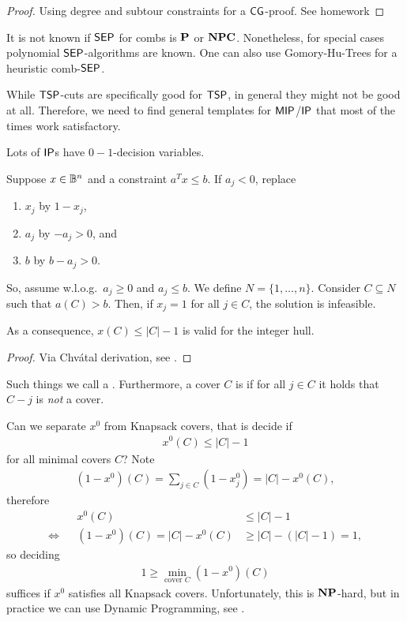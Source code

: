 \begin{proof}
    Using degree and subtour constraints for a $\mathsf{CG}$-proof. See homework 
\end{proof}
\begin{remark}
    It is not known if $\mathsf{SEP}$ for combs is $\mathbf{P}$ or $\mathbf{NPC}$.
    Nonetheless, for special cases polynomial $\mathsf{SEP}$-algorithms are known.
    One can also use Gomory-Hu-Trees for a heuristic comb-$\mathsf{SEP}$.
\end{remark}
While $\mathsf{TSP}$-cuts are specifically good for $\mathsf{TSP}$, in general they might not be good at all.
Therefore, we need to find general templates for $\mathsf{MIP}$/$\mathsf{IP}$ that most of the times work satisfactory.

Lots of $\mathsf{IP}$s have $0-1$-decision variables.

Suppose $x \in \mathbb{B}^n$ and a constraint $a^Tx \leq b$.
If $a_j < 0$, replace
\begin{enumerate}
    \item $x_j$ by $1-x_j$,
    \item $a_j$ by $-a_j > 0$, and
    \item $b$ by $b-a_j > 0$.
\end{enumerate}
So, assume w.l.o.g.\ $a_j \geq 0$ and $a_j \leq b$. We define $N = \{1,\dots, n\}$.
Consider $C \subseteq N$ such that $a(C)>b$.
Then, if $x_j=1$ for all $j \in C$, the solution is infeasible.
\begin{theorem}
    As a consequence, $x(C) \leq |C|-1$ is valid for the integer hull.
\end{theorem}
\begin{proof}
    Via Chv\'atal derivation, see .
\end{proof}
\begin{definition}
    Such things we call a .
    Furthermore,  a cover $C$ is  if for all $j \in C$ it holds that $C-j$ is \emph{not} a cover.
\end{definition}
Can we separate $x^0$ from Knapsack covers, that is decide if
\begin{align*}
    x^0(C) \leq |C|-1
\end{align*}
for all minimal covers $C$?
Note
\begin{align*}
    (1-x^0)(C) = \sum_{j \in C}(1-x^0_j)= |C|-x^0(C),
\end{align*}
therefore
\begin{align*}
                    &  & x^0(C)                  & \leq |C|-1            \\
    \Leftrightarrow &  & (1-x^0)(C) = |C|-x^0(C) & \geq |C| - (|C|-1)=1,
\end{align*}
so deciding
\begin{align*}
    1 \geq \min_{\text{cover }C}(1-x^0)(C)
\end{align*}
suffices if $x^0$ satisfies all Knapsack covers.
Unfortunately, this is $\mathbf{NP}$-hard, but in practice we can use Dynamic Programming, see .

